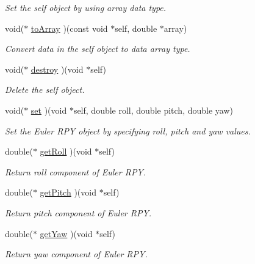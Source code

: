 \begin{CompactItemize}
\begin{CompactList}\small\item\em Set the self object by using array data type. \item\end{CompactList}\item 
void($\ast$ \hyperlink{structdrdc__eOrient__t_b91df71ef68638f3fcc2c0aff58f397c}{toArray} )(const void $\ast$self, double $\ast$array)
\begin{CompactList}\small\item\em Convert data in the self object to data array type. \item\end{CompactList}\item 
void($\ast$ \hyperlink{structdrdc__eOrient__t_cd7aeae5fcf08152b030a071523c1057}{destroy} )(void $\ast$self)
\begin{CompactList}\small\item\em Delete the self object. \item\end{CompactList}\item 
void($\ast$ \hyperlink{structdrdc__eOrient__t_75a0e0e07f9be15a987a776c139a9362}{set} )(void $\ast$self, double roll, double pitch, double yaw)
\begin{CompactList}\small\item\em Set the Euler RPY object by specifying roll, pitch and yaw values. \item\end{CompactList}\item 
double($\ast$ \hyperlink{structdrdc__eOrient__t_ffdb69bf51a40a9c4d860360ab87ec52}{getRoll} )(void $\ast$self)
\begin{CompactList}\small\item\em Return roll component of Euler RPY. \item\end{CompactList}\item 
double($\ast$ \hyperlink{structdrdc__eOrient__t_4af87907ffb2295b0fa044b185e8488d}{getPitch} )(void $\ast$self)
\begin{CompactList}\small\item\em Return pitch component of Euler RPY. \item\end{CompactList}\item 
double($\ast$ \hyperlink{structdrdc__eOrient__t_8037a80813d6a996bc85223fc4136ede}{getYaw} )(void $\ast$self)
\begin{CompactList}\small\item\em Return yaw component of Euler RPY. \item\end{CompactList}\item 

\end{CompactItemize}
